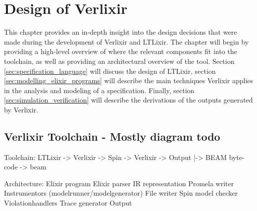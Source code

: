 \chapter{Design of Verlixir}
This chapter provides an in-depth insight into the design decisions that were made during the development of Verlixir and LTLixir. The chapter will begin by providing a high-level overview of where the relevant components fit into the toolchain, as well as providing an architectural overview of the tool. Section \ref{sec:specification_language} will discuss the design of LTLixir, section \ref{sec:modelling_elixir_programs} will describe the main techniques Verlixir applies in the analysis and modeling of a specification. Finally, section \ref{sec:simulation_verification} will describe the derivations of the outputs generated by Verlixir.  
\section{Verlixir Toolchain - Mostly diagram todo} \label{sec:toolchain}
Toolchain:
LTLixir -> Verlixir -> Spin -> Verlixir -> Output
|-> BEAM byte-code -> beam 

Architecture:
Elixir program
Elixir parser
IR representation
Promela writer
Instrumentors (modelrunner/modelgenerator)
File writer
Spin model checker
Violationhandlers
Trace generator
Output


